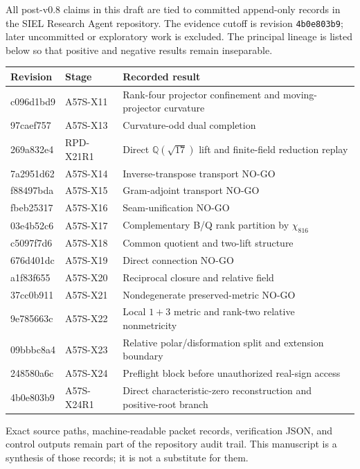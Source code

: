\documentclass[12pt,a4paper,twoside]{article}
\newcommand{\Qsqrt}{\mathbb{Q}(\sqrt{17})}
\begin{document}
All post-v0.8 claims in this draft are tied to committed append-only records in the SIEL Research Agent repository. The evidence cutoff is revision \texttt{4b0e803b9}; later uncommitted or exploratory work is excluded. The principal lineage is listed below so that positive and negative results remain inseparable.

\small
\begin{longtable}{>{\ttfamily}p{}p{}p{}}
\toprule
Revision & Stage & Recorded result \\
\midrule
\endhead
c096d1bd9 & A57S-X11 & Rank-four projector confinement and moving-projector curvature \\
97caef757 & A57S-X13 & Curvature-odd dual completion \\
269a832e4 & RPD-X21R1 & Direct $\Qsqrt$ lift and finite-field reduction replay \\
7a2951d62 & A57S-X14 & Inverse-transpose transport NO-GO \\
f88497bda & A57S-X15 & Gram-adjoint transport NO-GO \\
fbeb25317 & A57S-X16 & Seam-unification NO-GO \\
03e4b52c6 & A57S-X17 & Complementary B/Q rank partition by $\chi_{816}$ \\
c5097f7d6 & A57S-X18 & Common quotient and two-lift structure \\
676d401dc & A57S-X19 & Direct connection NO-GO \\
a1f83f655 & A57S-X20 & Reciprocal closure and relative field \\
37cc0b911 & A57S-X21 & Nondegenerate preserved-metric NO-GO \\
9e785663c & A57S-X22 & Local $1+3$ metric and rank-two relative nonmetricity \\
09bbbc8a4 & A57S-X23 & Relative polar/disformation split and extension boundary \\
248580a6c & A57S-X24 & Preflight block before unauthorized real-sign access \\
4b0e803b9 & A57S-X24R1 & Direct characteristic-zero reconstruction and positive-root branch \\
\bottomrule
\end{longtable}
\normalsize

Exact source paths, machine-readable packet records, verification JSON, and control outputs remain part of the repository audit trail. This manuscript is a synthesis of those records; it is not a substitute for them.
\end{document}
